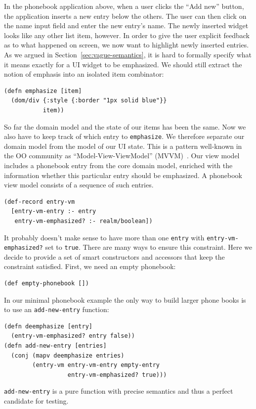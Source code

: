 \documentclass[sigplan,review,screen]{acmart}
\begin{document}
In the phonebook application above, when a user clicks the ``Add
new'' button, the application inserts a new entry below the others. The user can
then click on the name input field and enter the new entry's name. The
newly inserted widget looks like any other list item, however. In
order to give the user explicit feedback as to what happened on
screen, we now want to highlight newly inserted entries. As we argued
in Section~\ref{sec:vague-semantics}, it is hard to formally specify what it means exactly for a UI
widget to be emphasized. We should still extract the notion of
emphasis into an isolated item combinator:
%
\begin{verbatim}
(defn emphasize [item]
  (dom/div {:style {:border "1px solid blue"}}
           item))
\end{verbatim}
%
So far the domain model and the state of our items has been the same. Now
we also have to keep track of which entry to \texttt{emphasize}. We
therefore separate our domain model from the model of our UI state. This
is a pattern well-known in the OO community
as ``Model-View-ViewModel'' (MVVM)~\cite{MVVM}.
Our view model includes a phonebook entry from the core domain model,
enriched with the information whether this particular entry should be
emphasized. A phonebook view model consists of a sequence of such
entries.
%
\begin{verbatim}
(def-record entry-vm
  [entry-vm-entry :- entry
   entry-vm-emphasized? :- realm/boolean])
\end{verbatim}
%
It probably doesn't make sense to have more than one \texttt{entry} with
\texttt{entry-vm-emphasized?} set to \texttt{true}. There are many ways to
ensure this constraint. Here we decide to provide a set of smart
constructors and accessors that keep the constraint satisfied. First,
we need an empty phonebook:
%
\begin{verbatim}
(def empty-phonebook [])
\end{verbatim}
%
In our minimal phonebook example the only way to build larger phone
books is to use an \texttt{add-new-entry} function:
%
\begin{verbatim}
(defn deemphasize [entry]
  (entry-vm-emphasized? entry false))
(defn add-new-entry [entries]
  (conj (mapv deemphasize entries)
        (entry-vm entry-vm-entry empty-entry
                  entry-vm-emphasized? true)))
\end{verbatim}
%
\texttt{add-new-entry} is a pure function with precise semantics and
thus a perfect candidate for testing.
\end{document}
